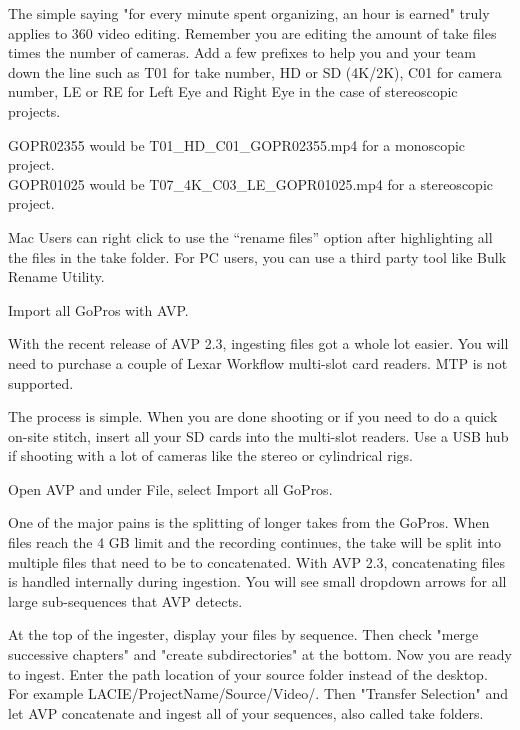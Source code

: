 \begin{fullwidth}
The simple saying "for every minute spent organizing, an hour is earned" truly applies to 360 video editing. Remember you are editing the amount of take files times the number of cameras. Add a few prefixes to help you and your team down the line such as T01 for take number, HD or SD (4K/2K), C01 for camera number, LE or RE for Left Eye and Right Eye in the case of stereoscopic projects.

\clearpage
GOPR02355 would be T01\_HD\_C01\_GOPR02355.mp4 for a monoscopic project.
\\
GOPR01025 would be T07\_4K\_C03\_LE\_GOPR01025.mp4 for a stereoscopic project.

\tip Mac Users can right click to use the “rename files” option after highlighting all the files in the take folder. For PC users, you can use a third party tool like Bulk Rename Utility.

{\large Import all GoPros with AVP. \par}

With the recent release of AVP 2.3, ingesting files got a whole lot easier. You will need to purchase a couple of Lexar Workflow multi-slot card readers. MTP is not supported.

The process is simple. When you are done shooting or if you need to do a quick on-site stitch, insert all your SD cards into the multi-slot readers. Use a USB hub if shooting with a lot of cameras like the stereo or cylindrical rigs.

Open AVP and under File, select Import all GoPros.


One of the major pains is the splitting of longer takes from the GoPros. When files reach the 4 GB limit and the recording continues, the take will be split into multiple files that need to be to concatenated. With AVP 2.3, concatenating files is handled internally during ingestion. You will see small dropdown arrows for all large sub-sequences that AVP detects.


At the top of the ingester, display your files by sequence. Then check "merge successive chapters" and "create subdirectories" at the bottom. Now you are ready to ingest. Enter the path location of your source folder instead of the desktop. For example LACIE/ProjectName/Source/Video/. Then "Transfer Selection" and let AVP concatenate and ingest all of your sequences, also called take folders.



\end{fullwidth}
